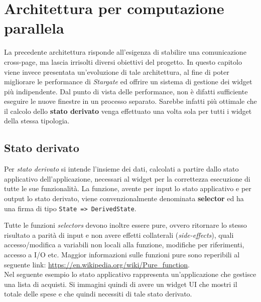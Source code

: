 
\chapter{Architettura per computazione parallela}
\label{cap:architettura-computazione-parallela}

La precedente architettura risponde all'esigenza di stabilire una comunicazione cross-page, ma lascia irrisolti diversi obiettivi del progetto. In questo capitolo viene invece presentata un'evoluzione di tale architettura, al fine di poter migliorare le performance di \textit{Stargate} ed offrire un sistema di gestione dei widget più indipendente.
Dal punto di vista delle performance, non è difatti sufficiente eseguire le nuove finestre in un processo separato. Sarebbe infatti più ottimale che il calcolo dello \textbf{stato derivato} venga effettuato una volta sola per tutti i widget della stessa tipologia.

\section{Stato derivato}

Per \textit{stato derivato} si intende l'insieme dei dati, calcolati a partire dallo stato applicativo dell'applicazione, necessari al widget per la correttezza esecuzione di tutte le sue funzionalità. La funzione, avente per input lo stato applicativo e per output lo stato derivato, viene convenzionalmente denominata \textbf{selector} ed ha una firma di tipo \texttt{State => DerivedState}.

Tutte le funzioni \textit{selectors} devono inoltre essere pure, ovvero ritornare lo stesso risultato a parità di input e non avere effetti collaterali (\textit{side-effects}), quali accesso/modifica a variabili non locali alla funzione, modifiche per riferimenti, accesso a I/O etc. Maggior informazioni sulle funzioni pure sono reperibili al seguente link: \url{https://en.wikipedia.org/wiki/Pure_function}. \\

Nel seguente esempio lo stato applicativo rappresenta un'applicazione che gestisce una lista di acquisti. Si immagini quindi di avere un widget UI che mostri il totale delle spese e che quindi necessiti di tale stato derivato.

